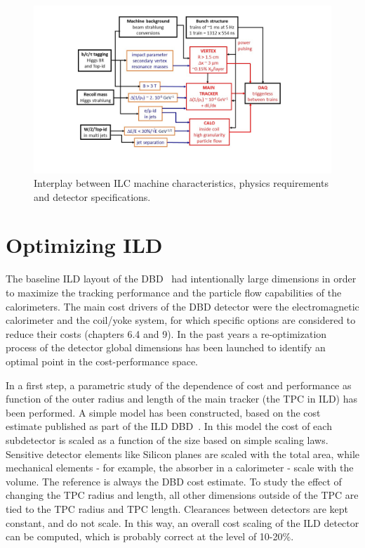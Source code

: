 \begin{figure}[t!]
\centering
\includegraphics[width=1.0\hsize]{ILD/fig/ILD_specifications.jpg}
\caption{Interplay between ILC machine characteristics, physics requirements and detector specifications.}
\label{fig:ILD:specifications}
\end{figure}


\section{Optimizing ILD}

The baseline ILD layout of the DBD~\cite{ild:bib:ilddbd} had intentionally large dimensions in order to maximize the tracking performance and the particle flow capabilities of the calorimeters. The main cost drivers of the DBD detector were the electromagnetic calorimeter and the coil/yoke system, for which specific options are considered to reduce their costs (chapters 6.4 and 9). In the past years a re-optimization process of the detector global dimensions has been launched to identify an optimal point in the cost-performance space.

In a first step, a parametric study \cite{Ref:bib:TPCOPT} of the dependence of cost and performance as function of the outer radius and length of the main tracker (the TPC in ILD) has been performed. 
A simple model has been constructed, based on the cost estimate published as part of the ILD DBD~\cite{ild:bib:ilddbd}. In this model the cost of each subdetector is scaled as a function of the size based on simple scaling laws. Sensitive detector elements like Silicon planes are scaled with the total area, while mechanical elements - for example, the absorber in a calorimeter - scale with the volume. The reference is always the DBD cost estimate. To study the effect of changing the TPC radius and length, all other dimensions outside of the TPC are tied to the TPC radius and TPC length. Clearances between detectors are kept constant, and do not scale. In this way, an overall cost scaling of the ILD detector can be computed, which is probably correct at the level of 10-20\%. 


